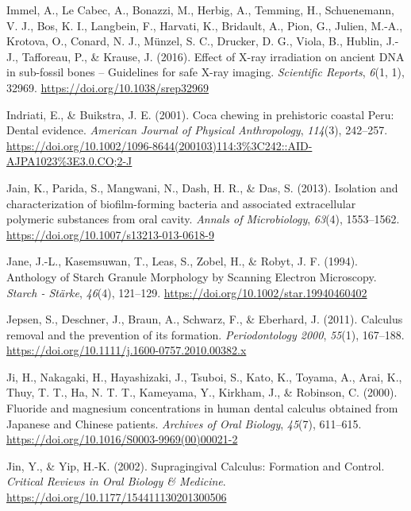 \documentclass[
  letterpaper,
]{book}
\newlength{\cslhangindent}
\newlength{\cslentryspacingunit} %
\newenvironment{CSLReferences}[2] %
 {%
  \setlength{\parindent}{0pt}
  \ifodd #1
  \let\oldpar\par
  \def\par{\hangindent=\cslhangindent\oldpar}
  \fi
  \setlength{\parskip}{#2\cslentryspacingunit}
 }%
 {}
\begin{document}
\begin{CSLReferences}{1}{0}
\leavevmode{}%
Immel, A., Le Cabec, A., Bonazzi, M., Herbig, A., Temming, H.,
Schuenemann, V. J., Bos, K. I., Langbein, F., Harvati, K., Bridault, A.,
Pion, G., Julien, M.-A., Krotova, O., Conard, N. J., Münzel, S. C.,
Drucker, D. G., Viola, B., Hublin, J.-J., Tafforeau, P., \& Krause, J.
(2016). Effect of {X-ray} irradiation on ancient {DNA} in sub-fossil
bones -- {Guidelines} for safe {X-ray} imaging. \emph{Scientific
Reports}, \emph{6}(1, 1), 32969. \url{https://doi.org/10.1038/srep32969}

\leavevmode{}%
Indriati, E., \& Buikstra, J. E. (2001). Coca chewing in prehistoric
coastal {Peru}: {Dental} evidence. \emph{American Journal of Physical
Anthropology}, \emph{114}(3), 242--257.
\url{https://doi.org/10.1002/1096-8644(200103)114:3\%3C242::AID-AJPA1023\%3E3.0.CO;2-J}

\leavevmode{}%
Jain, K., Parida, S., Mangwani, N., Dash, H. R., \& Das, S. (2013).
Isolation and characterization of biofilm-forming bacteria and
associated extracellular polymeric substances from oral cavity.
\emph{Annals of Microbiology}, \emph{63}(4), 1553--1562.
\url{https://doi.org/10.1007/s13213-013-0618-9}

\leavevmode{}%
Jane, J.-L., Kasemsuwan, T., Leas, S., Zobel, H., \& Robyt, J. F.
(1994). Anthology of {Starch Granule Morphology} by {Scanning Electron
Microscopy}. \emph{Starch - Stärke}, \emph{46}(4), 121--129.
\url{https://doi.org/10.1002/star.19940460402}

\leavevmode{}%
Jepsen, S., Deschner, J., Braun, A., Schwarz, F., \& Eberhard, J.
(2011). Calculus removal and the prevention of its formation.
\emph{Periodontology 2000}, \emph{55}(1), 167--188.
\url{https://doi.org/10.1111/j.1600-0757.2010.00382.x}

\leavevmode{}%
Ji, H., Nakagaki, H., Hayashizaki, J., Tsuboi, S., Kato, K., Toyama, A.,
Arai, K., Thuy, T. T., Ha, N. T. T., Kameyama, Y., Kirkham, J., \&
Robinson, C. (2000). Fluoride and magnesium concentrations in human
dental calculus obtained from {Japanese} and {Chinese} patients.
\emph{Archives of Oral Biology}, \emph{45}(7), 611--615.
\url{https://doi.org/10.1016/S0003-9969(00)00021-2}

\leavevmode{}%
Jin, Y., \& Yip, H.-K. (2002). Supragingival {Calculus}: {Formation} and
{Control}. \emph{Critical Reviews in Oral Biology \& Medicine}.
\url{https://doi.org/10.1177/154411130201300506}


\end{CSLReferences}
\end{document}
